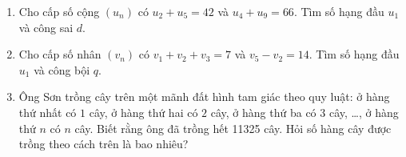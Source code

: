 \begin{bt}%

	\begin{enumerate}
		\item  Cho cấp số cộng $(u_n )$ có $u_2+u_5=42$ và $u_4+u_9=66$. Tìm số hạng đầu $u_1$ và công sai $d$.
		\item  Cho cấp số nhân $(v_n )$ có $v_1+v_2+v_3=7$ và $v_5-v_2=14$. Tìm số hạng đầu $u_1$ và công bội $q$.
		\item  Ông Sơn trồng cây trên một mãnh đất hình tam giác theo quy luật: ở hàng thứ nhất có $1$ cây, ở hàng thứ hai có $2$ cây, ở hàng thứ ba có $3$ cây, {\dots}, ở hàng thứ $n$ có $n$ cây. Biết rằng ông đã trồng hết 11325 cây. Hỏi số hàng cây được trồng theo cách trên là bao nhiêu?
	\end{enumerate}
\end{bt}
